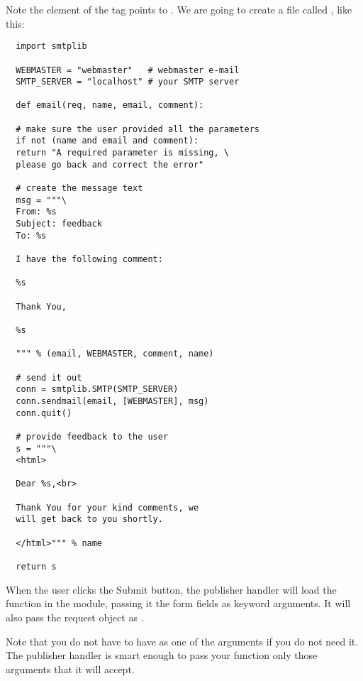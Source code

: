 Note the  element of the  tag points to
. We are going to create a file called
, like this:

\begin{verbatim}
  import smtplib

  WEBMASTER = "webmaster"   # webmaster e-mail
  SMTP_SERVER = "localhost" # your SMTP server

  def email(req, name, email, comment):

  # make sure the user provided all the parameters
  if not (name and email and comment):
  return "A required parameter is missing, \
  please go back and correct the error"

  # create the message text
  msg = """\
  From: %s                                                                                                                                           
  Subject: feedback
  To: %s

  I have the following comment:

  %s

  Thank You,

  %s                                                                                                                                                 

  """ % (email, WEBMASTER, comment, name)

  # send it out
  conn = smtplib.SMTP(SMTP_SERVER)
  conn.sendmail(email, [WEBMASTER], msg)
  conn.quit()

  # provide feedback to the user
  s = """\
  <html>

  Dear %s,<br>                                                                                                                                       

  Thank You for your kind comments, we
  will get back to you shortly.

  </html>""" % name

  return s
\end{verbatim}

When the user clicks the Submit button, the publisher handler will
load the  function in the  module,
passing it the form fields as keyword arguments. It will also pass the
request object as .

Note that you do not have to have \code{req} as one of the arguments
if you do not need it. The publisher handler is smart enough to pass
your function only those arguments that it will accept.

